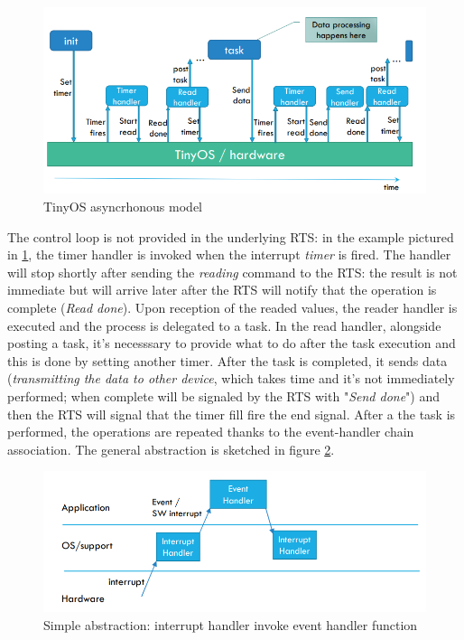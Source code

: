 \documentclass[10pt,a4paper]{report}
\theoremstyle{definition}
\begin{document}
\begin{figure}[h]
	\centering\includegraphics[scale=0.50]{images/Pasted image 20230418102218.png}
	\caption{TinyOS asyncrhonous model}
	\label{tinyos-model}
\end{figure}

The control loop is not provided in the underlying RTS: in the example pictured in \ref{tinyos-model}, the timer handler is invoked when the interrupt \textit{timer} is fired. The handler will stop shortly after sending the \textit{reading} command to the RTS: the result is not immediate but will arrive later after the RTS will notify that the operation is complete (\textit{Read done}).
Upon reception of the readed values, the reader handler is executed and the process is delegated to a task. In the read handler, alongside posting a task, it's necesssary to provide what to do after the task execution and this is done by setting another timer. After the task is completed, it sends data (\textit{transmitting the data to other device}, which takes time and it's not immediately performed; when complete will be signaled by the RTS with "\textit{Send done}") and then the RTS will signal that the timer fill fire the end signal.
After a the task is performed, the operations are repeated thanks to the event-handler chain association. The general abstraction is sketched in figure \ref{tinyos-model-abstract1}.
\begin{figure}[h]
	\centering\includegraphics[scale=0.50]{images/Pasted image 20230418120212.png}
	\caption{Simple abstraction: interrupt handler invoke event handler function}
	\label{tinyos-model-abstract1}
\end{figure}
\end{document}
